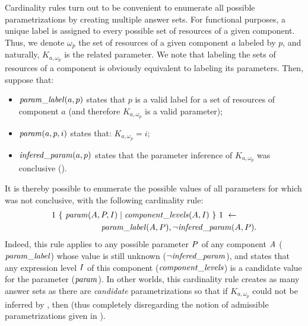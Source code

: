 Cardinality rules turn out to be convenient to enumerate all possible parametrizations by creating multiple answer sets.
For functional purposes, a unique label is assigned to every possible set of resources of a given component.
Thus, we denote $\omega_p$ the set of resources of a given component $a$ labeled by $p$,
and naturally, $K_{a,\omega_p}$ is the related parameter.
We note that labeling the sets of resources of a component is obviously equivalent to labeling its parameters.
Then, suppose that:
\begin{itemize}
  \item $\mathit{param\_label}(a, p)$ states that $p$ is a valid label for a set of resources of component $a$ (and therefore $K_{a,\omega_p}$ is a valid parameter);
  \item $\mathit{param}(a, p, i)$ states that: $K_{a, \omega_p} = i$;
  \item $\mathit{infered\_param}(a, p)$ states that the parameter inference of $K_{a, \omega_p}$ was conclusive ().
\end{itemize}
It is thereby possible to enumerate the possible values of all parameters for which  was not conclusive, with the following cardinality rule:
\begin{align*}
  & 1\ \{\ \mathit{param}(A, P, I) \mid \mathit{component\_levels}(A, I)\ \}\ 1\ \leftarrow \\
  & \qquad\qquad\qquad \mathit{param\_label}(A, P), \neg \mathit{infered\_param}(A, P).
\end{align*}
Indeed, this rule applies to any possible parameter $P$ of any component $A$ ($\mathit{param\_label}$) whose value is still unknown ($\neg \mathit{infered\_param}$),
and states that any expression level $I$ of this component ($\mathit{component\_levels}$)
is a candidate value for the parameter ($\mathit{param}$).
In other worlds, this cardinality rule creates as many answer sets as there are \emph{candidate} parametrizations
so that if $K_{a, \omega_p}$ could not be inferred by , then
(thus completely disregarding the notion of admissible parametrizations given in ).



